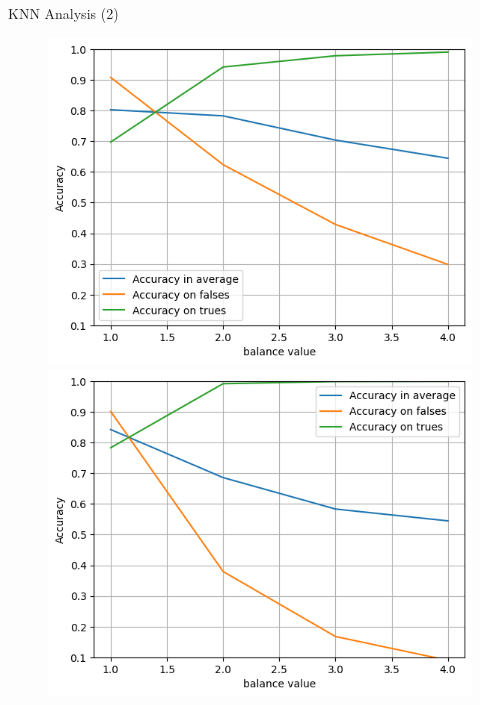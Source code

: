 \documentclass{beamer}
\begin{document}
\begin{frame}[shrink]{KNN Analysis (2)}
\begin{figure}
    \begin{minipage}{0.49\textwidth}
    \centering
    \includegraphics[width=\linewidth]{balancek50.png}
    \end{minipage}
    \centering
    \begin{minipage}{0.49\textwidth}
    \includegraphics[width=\linewidth]{balancek500.png}
    \end{minipage}
\end{figure}


\end{frame}
\end{document}
